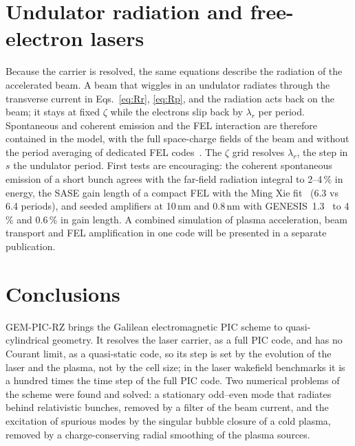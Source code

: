 \documentclass[aps,prab,reprint,floatfix,superscriptaddress,amsmath,amssymb]{revtex4-2}
\providecommand{\DIFaddend}{} %
\DeclareRobustCommand{\DIFaddend}{\DIFOaddend \let\includegraphics\DIFOincludegraphics} %
\begin{document}
\DIFaddend %
\section{Undulator radiation and free-electron lasers}\label{sec:fel}

Because the carrier is resolved, the same equations describe the radiation of the accelerated beam. A beam that wiggles in an undulator radiates through the transverse current in Eqs.~\eqref{eq:Rr}, \eqref{eq:Rp}, and the radiation acts back on the beam; it stays at fixed $\zeta$ while the electrons slip back by $\lambda_r$ per period. Spontaneous and coherent emission and the FEL interaction are therefore contained in the model, with the full space-charge fields of the beam and without the period averaging of dedicated FEL codes~\cite{Reiche1999}. The $\zeta$ grid resolves $\lambda_r$, the step in $s$ the undulator period. First tests are encouraging: the coherent spontaneous emission of a short bunch agrees with the far-field radiation integral to 2--4\,\% in energy, the SASE gain length of a compact FEL with the Ming Xie fit~\cite{Xie1995} (6.3 vs 6.4 periods), and seeded amplifiers at 10\,nm and 0.8\,nm with GENESIS~1.3~\cite{Reiche1999} to 4\,\% and 0.6\,\% in gain length. A combined simulation of plasma acceleration, beam transport and FEL amplification in one code will be presented in a separate publication.

\section{Conclusions}\label{sec:concl}

GEM-PIC-RZ brings the Galilean electromagnetic PIC scheme to quasi-cylindrical geometry. It resolves the laser carrier, as a full PIC code, and has no Courant limit, as a quasi-static code, so its step is set by the evolution of the laser and the plasma, not by the cell size; in the laser wakefield benchmarks it is a hundred times the time step of the full PIC code. Two numerical problems of the scheme were found and solved: a stationary odd--even mode that radiates behind relativistic bunches, removed by a filter of the beam current, and the excitation of spurious modes by the singular bubble closure of a cold plasma, removed by a charge-conserving radial smoothing of the plasma sources.
\end{document}
